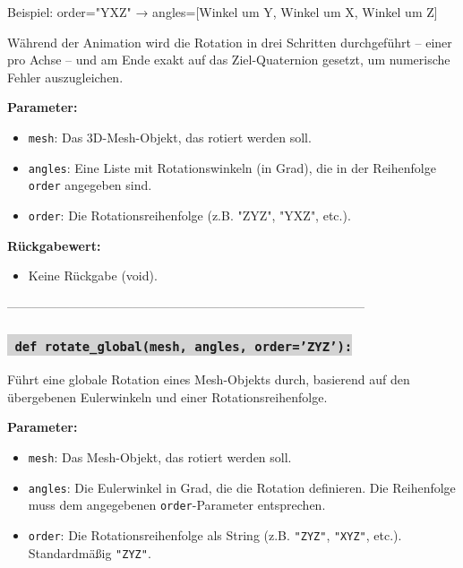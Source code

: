 Beispiel: order="YXZ" → angles=[Winkel um Y, Winkel um X, Winkel um Z]

Während der Animation wird die Rotation in drei Schritten durchgeführt – einer pro Achse – und am Ende exakt auf das Ziel-Quaternion gesetzt, um numerische Fehler auszugleichen.

\noindent \textbf{Parameter:} \vspace{-6ex} \\
\begin{itemize}
    \setlength{\itemindent}{1em}
    \item \texttt{mesh}: Das 3D-Mesh-Objekt, das rotiert werden soll.
    \item \texttt{angles}: Eine Liste mit Rotationswinkeln (in Grad), die in der Reihenfolge \texttt{order} angegeben sind.
    \item \texttt{order}: Die Rotationsreihenfolge (z.B. "ZYZ", "YXZ", etc.).
\end{itemize}

\noindent \textbf{Rückgabewert:} \vspace{-6ex} \\
\begin{itemize}
    \setlength{\itemindent}{1em}
    \item Keine Rückgabe (void).
\end{itemize}

--------------------------------------------------------------------------------------



\subsubsection*{\colorbox{lightgray}{\texttt{\textbf{\color{green} def} \color{blue} rotate\_global}\textbf{\texttt{(mesh, angles, order='ZYZ'):}}}}
Führt eine globale Rotation eines Mesh-Objekts durch, basierend auf den übergebenen Eulerwinkeln und einer Rotationsreihenfolge.

\noindent \textbf{Parameter:} \vspace{-6ex} \\
\begin{itemize}
    \setlength{\itemindent}{1em}
    \item \texttt{mesh}: Das Mesh-Objekt, das rotiert werden soll.
    \item \texttt{angles}: Die Eulerwinkel in Grad, die die Rotation definieren. Die Reihenfolge muss dem angegebenen \texttt{order}-Parameter entsprechen.
    \item \texttt{order}: Die Rotationsreihenfolge als String (z.B. \texttt{"ZYZ"}, \texttt{"XYZ"}, etc.). Standardmäßig \texttt{"ZYZ"}.
\end{itemize}

